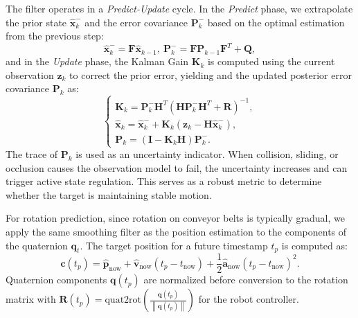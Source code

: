 The filter operates in a \textit{Predict-Update} cycle.  In the \textit{Predict} phase, we extrapolate the prior state $\hat{\boldsymbol{x}}_{k}^{-}$ and the error covariance $\boldsymbol{P}_{k}^{-}$ based on the optimal estimation  from the previous step:
\begin{equation}
\hat{\boldsymbol{x}}_{k}^{-}=\boldsymbol{F}\hat{\boldsymbol{x}}_{k-1},\
\boldsymbol{P}_{k}^{-}=\boldsymbol{F}\boldsymbol{P}_{k-1}\boldsymbol{F}^{T}+\boldsymbol{Q},
\label{eq:kf_predict}
\end{equation}
and in the \textit{Update} phase, the Kalman Gain $\boldsymbol{K}_{k}$ is computed using the current observation $\boldsymbol{z}_k$ to correct the prior error, yielding  and the updated posterior error covariance $\boldsymbol{P}_{k}$ as:
\begin{equation}
\begin{cases}
    \boldsymbol{K}_{k}=\boldsymbol{P}_{k}^{-}\boldsymbol{H}^{T}(\boldsymbol{H}\boldsymbol{P}_{k}^{-}\boldsymbol{H}^{T}+\boldsymbol{R})^{-1}, \\
\hat{\boldsymbol{x}}_{k}=\hat{\boldsymbol{x}}_{k}^{-}+\boldsymbol{K}_{k}(\boldsymbol{z}_{k}-\boldsymbol{H}\hat{\boldsymbol{x}}_{k}^{-}), \\
\boldsymbol{P}_{k}=(\boldsymbol{I}-\boldsymbol{K}_{k}\boldsymbol{H})\boldsymbol{P}_{k}^{-}.
\end{cases}
\end{equation}
The trace of $\boldsymbol{P}_{k}$ is used as an uncertainty indicator. When collision, sliding, or occlusion causes the observation model to fail, the uncertainty increases and can trigger active state regulation. This serves as a robust metric to determine whether the target is maintaining stable motion. 

For rotation prediction, since rotation on conveyor belts is typically gradual, we apply the same smoothing filter as the position estimation to the components of the quaternion $\boldsymbol{q}_t$. The target position for a future timestamp $t_p$ is computed as:
\begin{equation}
\boldsymbol{c}(t_p)=\hat{\boldsymbol{p}}_{\text{now}}+\hat{\boldsymbol{v}}_{\text{now}}(t_p-t_{\text{now}})+\frac{1}{2}\hat{\boldsymbol{a}}_{\text{now}}(t_p-t_{\text{now}})^2.
\end{equation}
Quaternion components $\boldsymbol{q}(t_p)$ are normalized before conversion to the rotation matrix with $\boldsymbol{R}(t_p) = \mathrm{quat2rot}(\frac{\boldsymbol{q}(t_p)}{\left \| \boldsymbol{q}(t_p) \right \| })$ for the robot controller.

